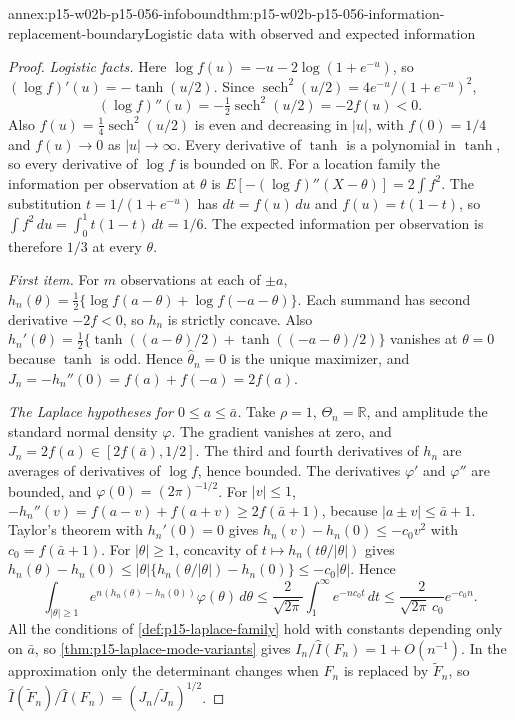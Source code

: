 \begin{annexitem}{annex:p15-w02b-p15-056-infobound}{thm:p15-w02b-p15-056-information-replacement-boundary}{Logistic data with observed and expected information}
\begin{proof}
\emph{Logistic facts.} Here \(\log f(u)=-u-2\log(1+e^{-u})\), so
\((\log f)'(u)=-\tanh(u/2)\). Since
\(\operatorname{sech}^2(u/2)=4e^{-u}/(1+e^{-u})^2\),
\[
 (\log f)''(u)=-\tfrac12\operatorname{sech}^2(u/2)=-2f(u)<0 .
\] Also
\(f(u)=\tfrac14\operatorname{sech}^2(u/2)\) is even and decreasing in
\(|u|\), with \(f(0)=1/4\) and \(f(u)\to0\) as \(|u|\to\infty\). Every
derivative of \(\tanh\) is a polynomial in \(\tanh\), so every derivative
of \(\log f\) is bounded on \(\mathbb R\). For a location family the
information per observation at \(\theta\) is
\(E[-(\log f)''(X-\theta)]=2\int f^2\). The substitution
\(t=1/(1+e^{-u})\) has \(dt=f(u)\,du\) and \(f(u)=t(1-t)\), so
\(\int f^2\,du=\int_0^1t(1-t)\,dt=1/6\). The expected information per
observation is therefore \(1/3\) at every \(\theta\).

\emph{First item.} For \(m\) observations at each of \(\pm a\),
\(h_n(\theta)=\tfrac12\{\log f(a-\theta)+\log f(-a-\theta)\}\). Each
summand has second derivative \(-2f<0\), so \(h_n\) is strictly concave.
Also \(h_n'(\theta)=\tfrac12\{\tanh((a-\theta)/2)+\tanh((-a-\theta)/2)\}\)
vanishes at \(\theta=0\) because \(\tanh\) is odd. Hence
\(\widehat\theta_n=0\) is the unique maximizer, and
\(J_n=-h_n''(0)=f(a)+f(-a)=2f(a)\).

\emph{The Laplace hypotheses for \(0\leq a\leq\bar a\).} Take
\(\rho=1\), \(\Theta_n=\mathbb R\), and amplitude the standard normal
density \(\varphi\). The gradient vanishes at zero, and
\(J_n=2f(a)\in[2f(\bar a),1/2]\). The third and fourth derivatives of
\(h_n\) are averages of derivatives of \(\log f\), hence bounded. The
derivatives \(\varphi'\) and \(\varphi''\) are bounded, and
\(\varphi(0)=(2\pi)^{-1/2}\). For \(|v|\leq1\),
\(-h_n''(v)=f(a-v)+f(a+v)\geq2f(\bar a+1)\), because
\(|a\pm v|\leq\bar a+1\). Taylor's theorem with \(h_n'(0)=0\) gives
\(h_n(v)-h_n(0)\leq-c_0v^2\) with \(c_0=f(\bar a+1)\). For
\(|\theta|\geq1\), concavity of \(t\mapsto h_n(t\theta/|\theta|)\)
gives
\(h_n(\theta)-h_n(0)\leq|\theta|\{h_n(\theta/|\theta|)-h_n(0)\}\leq-c_0|\theta|\).
Hence
\[
 \int_{|\theta|\geq1}e^{n(h_n(\theta)-h_n(0))}\varphi(\theta)\,d\theta
 \leq\frac2{\sqrt{2\pi}}\int_1^\infty e^{-nc_0t}\,dt
 \leq\frac{2}{\sqrt{2\pi}\,c_0}e^{-c_0n}.
\]
All the conditions of \cref{def:p15-laplace-family} hold with constants
depending only on \(\bar a\), so \cref{thm:p15-laplace-mode-variants}
gives \(I_n/\widehat I(F_n)=1+O(n^{-1})\). In the approximation only the
determinant changes when \(F_n\) is replaced by \(\widetilde F_n\), so
\(\widehat I(\widetilde F_n)/\widehat I(F_n)=(J_n/\widetilde J_n)^{1/2}\).


\end{proof}
\end{annexitem}
